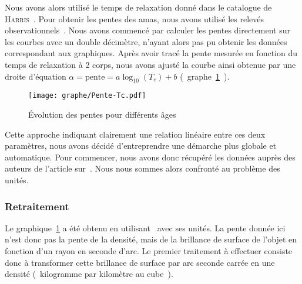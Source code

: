 				Nous avons alors utilisé le temps de relaxation donné dans le catalogue de \textsc{Harris}~\cite{Harris}.
				Pour obtenir les pentes des amas, nous avons utilisé les relevés observationnels~\cite{Trager-graphe}. %
				Nous avons commencé par calculer les pentes directement sur les courbes avec un double décimètre, n'ayant alors pas pu obtenir les données correspondant aux graphiques.
				Après avoir tracé la pente mesurée en fonction du temps de relaxation à 2 corps, nous avons ajusté la
				courbe ainsi obtenue par une droite d'équation $ \alpha = \mathrm{pente} = a \log_{10}(T_c) + b$ (~graphe~\ref{Pente-lin}~).
				\begin{figure}[hbt!]
					\centering \texttt{[image: graphe/Pente-Tc.pdf]}
					\caption{Évolution des pentes pour différents âges}
					\label{Pente-lin}
				\end{figure}

				Cette approche indiquant clairement une relation linéaire entre ces deux paramètres, nous avons décidé d'entreprendre une démarche plus globale et automatique.
				Pour commencer, nous avons donc récupéré les données auprès des auteurs de l'article sur~\cite{TragerTable}. Nous nous sommes alors confronté au problème des unités.

			\subsubsection{Retraitement}
				Le graphique~\ref{Pente-lin} a été obtenu en utilisant~\cite{Trager-graphe} avec ses unités. %
				La pente donnée ici n'est donc pas la pente de la densité, mais de la brillance de surface de l'objet en fonction d'un rayon en seconde d'arc.
				Le premier traitement à effectuer consiste donc à transformer cette brillance de surface par arc seconde carrée en une densité (~kilogramme par kilomètre au cube~).

